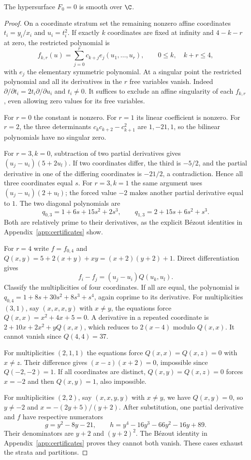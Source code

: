 \begin{lemma}\label{lem:smoothseed}
The hypersurface $F_0=0$ is smooth over $\C$.
\end{lemma}
\begin{proof}
On a coordinate stratum set the remaining nonzero affine coordinates
$t_i=y_i/x_i$ and $u_i=t_i^2$. If exactly $k$ coordinates are fixed at
infinity and $4-k-r$ at zero, the restricted polynomial is
\[
 f_{k,r}(u)=\sum_{j=0}^r c_{k+j}e_j(u_1,\ldots,u_r),
 \qquad 0\le k,\quad k+r\le4,
\]
with $e_j$ the elementary symmetric polynomial. At a singular point the
restricted polynomial and all its derivatives in the $r$ free variables
vanish. Indeed $\partial/\partial t_i=2t_i\partial/\partial u_i$ and
$t_i\ne0$. It suffices to exclude an affine singularity of each $f_{k,r}$,
even allowing zero values for its free variables.

For $r=0$ the constant is nonzero. For $r=1$ its linear coefficient is
nonzero. For $r=2$, the three determinants
$c_kc_{k+2}-c_{k+1}^2$ are $1,-21,1$, so the bilinear polynomials have
no singular zero.

For $r=3,k=0$, subtraction of two partial derivatives gives
$(u_j-u_i)(5+2u_l)$. If two coordinates differ, the third is $-5/2$,
and the partial derivative in one of the differing coordinates is
$-21/2$, a contradiction. Hence all three coordinates equal $s$.
For $r=3,k=1$ the same argument uses $(u_j-u_i)(2+u_l)$;
the forced value $-2$ makes another partial derivative equal to $1$.
The two diagonal polynomials are
\[
 q_{0,3}=1+6s+15s^2+2s^3,\qquad
 q_{1,3}=2+15s+6s^2+s^3.
\]
Both are relatively prime to their derivatives, as the explicit
B\'ezout identities in Appendix~\ref{app:certificates} show.

For $r=4$ write $f=f_{0,4}$ and
$Q(x,y)=5+2(x+y)+xy=(x+2)(y+2)+1$. Direct differentiation gives
\[
 f_i-f_j=(u_j-u_i)Q(u_k,u_l).
\]
Classify the multiplicities of four coordinates. If all are equal,
the polynomial is $q_{0,4}=1+8s+30s^2+8s^3+s^4$, again coprime to
its derivative. For multiplicities $(3,1)$, say $(x,x,x,y)$ with
$x\ne y$, the equations force $Q(x,x)=x^2+4x+5=0$.
A derivative in a repeated coordinate is $2+10x+2x^2+yQ(x,x)$,
which reduces to $2(x-4)$ modulo $Q(x,x)$. It cannot vanish since
$Q(4,4)=37$.

For multiplicities $(2,1,1)$ the equations force
$Q(x,x)=Q(x,z)=0$ with $x\ne z$. Their difference gives
$(x-z)(x+2)=0$, impossible since $Q(-2,-2)=1$. If all coordinates
are distinct, $Q(x,y)=Q(x,z)=0$ forces $x=-2$ and then $Q(x,y)=1$,
also impossible.

For multiplicities $(2,2)$, say $(x,x,y,y)$ with $x\ne y$, we have
$Q(x,y)=0$, so $y\ne-2$ and $x=-(2y+5)/(y+2)$.
After substitution, one partial derivative and $f$ have respective
numerators
\[
 g=y^2-8y-21,\qquad h=y^4-16y^3-66y^2-16y+89.
\]
Their denominators are $y+2$ and $(y+2)^2$.
The B\'ezout identity in Appendix~\ref{app:certificates} proves they
cannot both vanish. These cases exhaust the strata and partitions.
\end{proof}

